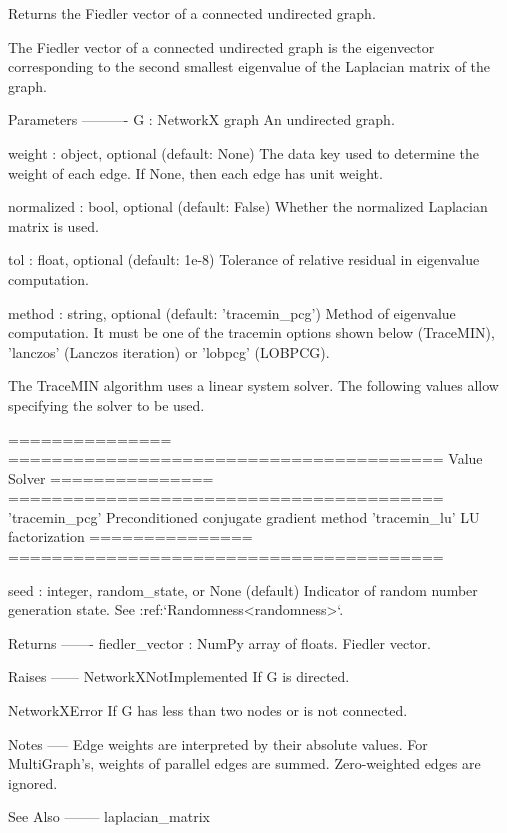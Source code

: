 \begin{DoxyVerb}Returns the Fiedler vector of a connected undirected graph.

The Fiedler vector of a connected undirected graph is the eigenvector
corresponding to the second smallest eigenvalue of the Laplacian matrix
of the graph.

Parameters
----------
G : NetworkX graph
    An undirected graph.

weight : object, optional (default: None)
    The data key used to determine the weight of each edge. If None, then
    each edge has unit weight.

normalized : bool, optional (default: False)
    Whether the normalized Laplacian matrix is used.

tol : float, optional (default: 1e-8)
    Tolerance of relative residual in eigenvalue computation.

method : string, optional (default: 'tracemin_pcg')
    Method of eigenvalue computation. It must be one of the tracemin
    options shown below (TraceMIN), 'lanczos' (Lanczos iteration)
    or 'lobpcg' (LOBPCG).

    The TraceMIN algorithm uses a linear system solver. The following
    values allow specifying the solver to be used.

    =============== ========================================
    Value           Solver
    =============== ========================================
    'tracemin_pcg'  Preconditioned conjugate gradient method
    'tracemin_lu'   LU factorization
    =============== ========================================

seed : integer, random_state, or None (default)
    Indicator of random number generation state.
    See :ref:`Randomness<randomness>`.

Returns
-------
fiedler_vector : NumPy array of floats.
    Fiedler vector.

Raises
------
NetworkXNotImplemented
    If G is directed.

NetworkXError
    If G has less than two nodes or is not connected.

Notes
-----
Edge weights are interpreted by their absolute values. For MultiGraph's,
weights of parallel edges are summed. Zero-weighted edges are ignored.

See Also
--------
laplacian_matrix
\end{DoxyVerb}
 \mbox{\label{namespacenetworkx_1_1linalg_1_1algebraicconnectivity_a51ebf49ae3fabf3461120a0a4b8007a7}} 
